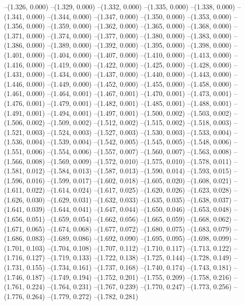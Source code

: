 {--(1.326, 0.000)
--(1.329, 0.000)
--(1.332, 0.000)
--(1.335, 0.000)
--(1.338, 0.000)
--(1.341, 0.000)
--(1.344, 0.000)
--(1.347, 0.000)
--(1.350, 0.000)
--(1.353, 0.000)
--(1.356, 0.000)
--(1.359, 0.000)
--(1.362, 0.000)
--(1.365, 0.000)
--(1.368, 0.000)
--(1.371, 0.000)
--(1.374, 0.000)
--(1.377, 0.000)
--(1.380, 0.000)
--(1.383, 0.000)
--(1.386, 0.000)
--(1.389, 0.000)
--(1.392, 0.000)
--(1.395, 0.000)
--(1.398, 0.000)
--(1.401, 0.000)
--(1.404, 0.000)
--(1.407, 0.000)
--(1.410, 0.000)
--(1.413, 0.000)
--(1.416, 0.000)
--(1.419, 0.000)
--(1.422, 0.000)
--(1.425, 0.000)
--(1.428, 0.000)
--(1.431, 0.000)
--(1.434, 0.000)
--(1.437, 0.000)
--(1.440, 0.000)
--(1.443, 0.000)
--(1.446, 0.000)
--(1.449, 0.000)
--(1.452, 0.000)
--(1.455, 0.000)
--(1.458, 0.000)
--(1.461, 0.000)
--(1.464, 0.001)
--(1.467, 0.001)
--(1.470, 0.001)
--(1.473, 0.001)
--(1.476, 0.001)
--(1.479, 0.001)
--(1.482, 0.001)
--(1.485, 0.001)
--(1.488, 0.001)
--(1.491, 0.001)
--(1.494, 0.001)
--(1.497, 0.001)
--(1.500, 0.002)
--(1.503, 0.002)
--(1.506, 0.002)
--(1.509, 0.002)
--(1.512, 0.002)
--(1.515, 0.002)
--(1.518, 0.003)
--(1.521, 0.003)
--(1.524, 0.003)
--(1.527, 0.003)
--(1.530, 0.003)
--(1.533, 0.004)
--(1.536, 0.004)
--(1.539, 0.004)
--(1.542, 0.005)
--(1.545, 0.005)
--(1.548, 0.006)
--(1.551, 0.006)
--(1.554, 0.006)
--(1.557, 0.007)
--(1.560, 0.007)
--(1.563, 0.008)
--(1.566, 0.008)
--(1.569, 0.009)
--(1.572, 0.010)
--(1.575, 0.010)
--(1.578, 0.011)
--(1.581, 0.012)
--(1.584, 0.013)
--(1.587, 0.013)
--(1.590, 0.014)
--(1.593, 0.015)
--(1.596, 0.016)
--(1.599, 0.017)
--(1.602, 0.018)
--(1.605, 0.020)
--(1.608, 0.021)
--(1.611, 0.022)
--(1.614, 0.024)
--(1.617, 0.025)
--(1.620, 0.026)
--(1.623, 0.028)
--(1.626, 0.030)
--(1.629, 0.031)
--(1.632, 0.033)
--(1.635, 0.035)
--(1.638, 0.037)
--(1.641, 0.039)
--(1.644, 0.041)
--(1.647, 0.044)
--(1.650, 0.046)
--(1.653, 0.048)
--(1.656, 0.051)
--(1.659, 0.054)
--(1.662, 0.056)
--(1.665, 0.059)
--(1.668, 0.062)
--(1.671, 0.065)
--(1.674, 0.068)
--(1.677, 0.072)
--(1.680, 0.075)
--(1.683, 0.079)
--(1.686, 0.083)
--(1.689, 0.086)
--(1.692, 0.090)
--(1.695, 0.095)
--(1.698, 0.099)
--(1.701, 0.103)
--(1.704, 0.108)
--(1.707, 0.112)
--(1.710, 0.117)
--(1.713, 0.122)
--(1.716, 0.127)
--(1.719, 0.133)
--(1.722, 0.138)
--(1.725, 0.144)
--(1.728, 0.149)
--(1.731, 0.155)
--(1.734, 0.161)
--(1.737, 0.168)
--(1.740, 0.174)
--(1.743, 0.181)
--(1.746, 0.187)
--(1.749, 0.194)
--(1.752, 0.201)
--(1.755, 0.209)
--(1.758, 0.216)
--(1.761, 0.224)
--(1.764, 0.231)
--(1.767, 0.239)
--(1.770, 0.247)
--(1.773, 0.256)
--(1.776, 0.264)
--(1.779, 0.272)
--(1.782, 0.281)
}
